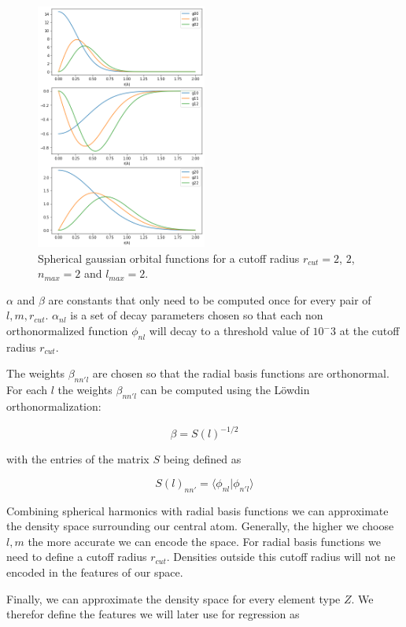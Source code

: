 \begin{figure} [h]
  \centering
  \includegraphics[width=0.5\textwidth]{figures/snap/gaus_orb.png} %
  \caption{Spherical gaussian orbital functions for a cutoff radius $r_{cut}=2$, $2$, $n_{max}=2$ and $l_{max}=2$. }
  \label{fig:gaussians}
\end{figure}

$\alpha$ and $\beta$ are constants that only need to be computed once for every pair of $l,m, r_{cut}$.
$\alpha_{nl}$ is a set of decay parameters chosen so that each non orthonormalized function $\phi_{nl}$ 
will decay to a threshold value of $10^-3$ at the cutoff radius $r_{cut}$.

The weights $\beta_{nn'l}$ are chosen so that the radial basis functions are orthonormal.
For each $l$ the weights $\beta_{nn'l}$ can be computed using the Löwdin orthonormalization:

$$\beta = S(l)^{-1/2} $$

with the entries of the matrix $S$ being defined as

$$S(l)_{nn'} = \langle \phi_{nl} | \phi_{n'l} \rangle  $$

Combining spherical harmonics with radial basis functions we can approximate the density space surrounding our central atom.
Generally, the higher we choose $l, m$ the more accurate we can encode the space.
For radial basis functions we need to define a cutoff radius $r_{cut}$.
Densities outside this cutoff radius will not ne encoded in the features of our space.

Finally, we can approximate the density space for every element type $Z$.
We therefor define the features we will later use for regression as

